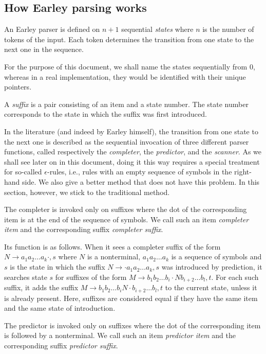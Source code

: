\documentclass[11pt]{article}
\def\ra{\rightarrow}
\begin{document}
\subsection{How Earley parsing works}

An Earley parser is defined on $n+1$ sequential \emph{states} where
$n$ is the number of tokens of the input.  Each token determines the
transition from one state to the next one in the sequence.

For the purpose of this document, we shall name the states
sequentially from $0$, whereas in a real implementation, they would be
identified with their unique pointers. 

A \emph{suffix} is a pair consisting of an item and a state number.
The state number corresponds to the state in which the suffix was
first introduced. 

In the literature (and indeed by Earley himself), the transition from
one state to the next one is described as the sequential invocation of
three different parser functions, called respectively the
\emph{completer}, the \emph{predictor}, and the \emph{scanner}.  As we
shall see later on in this document, doing it this way requires a
special treatment for so-called $\epsilon$-rules, i.e., rules with an
empty sequence of symbols in the right-hand side.  We also give a
better method that does not have this problem.  In this section,
however, we stick to the traditional method.

The completer is invoked only on suffixes where the dot of the
corresponding item is at the end of the sequence of symbols.  We call
such an item \emph{completer item} and the corresponding suffix
\emph{completer suffix}.  

Its function is as follows.  When it sees a completer suffix of the
form $N \ra a_1 a_2 \ldots a_k \cdot, s$ where $N$ is a nonterminal,
$a_1 a_2 \ldots a_k$ is a sequence of symbols and $s$ is the state in
which the suffix $N \ra \cdot a_1 a_2 \ldots a_k, s$ was introduced by
prediction, it searches state $s$ for suffixes of the form 
$M \ra b_1 b_2 \ldots b_i \cdot N b_{i+2} \ldots b_l, t$.  For each
such suffix, it adds the suffix $M \ra b_1 b_2 \ldots b_i N \cdot
b_{i+2} \ldots b_l, t$ to the current state, unless it is already
present.  Here, suffixes are considered equal if they have the same
item and the same state of introduction.  

The predictor is invoked only on suffixes where the dot of the
corresponding item is followed by a nonterminal.  We call such an item
\emph{predictor item} and the corresponding suffix \emph{predictor
suffix}.
\end{document}
